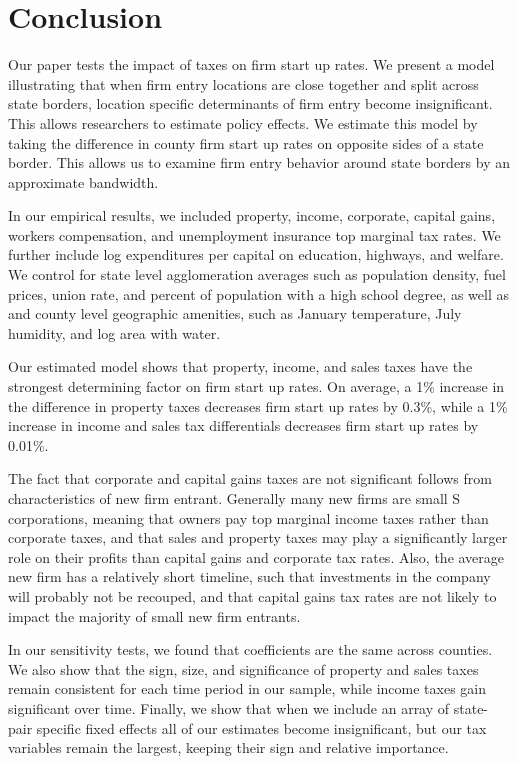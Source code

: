 \section{Conclusion}

Our paper tests the impact of taxes on firm start up rates. We present a model illustrating that when firm entry locations are close together and split across state borders, location specific determinants of firm entry become insignificant. This allows researchers to estimate policy effects. We estimate this model by taking the difference in county firm start up rates on opposite sides of a state border. This allows us to examine firm entry behavior around state borders by an approximate bandwidth.

In our empirical results, we included property, income, corporate, capital gains, workers compensation, and unemployment insurance top marginal tax rates. We further include log expenditures per capital on education, highways, and welfare. We control for state level agglomeration averages such as population density, fuel prices, union rate, and percent of population with a high school degree, as well as and county level geographic amenities, such as January temperature, July humidity, and log area with water.

Our estimated model shows that property, income, and sales taxes have the strongest determining factor on firm start up rates. On average, a 1\% increase in the difference in property taxes decreases firm start up rates by 0.3\%, while a 1\% increase in income and sales tax differentials decreases firm start up rates by 0.01\%. 

The fact that corporate and capital gains taxes are not significant follows from characteristics of new firm entrant. Generally many new firms are small S corporations, meaning that owners pay top marginal income taxes rather than corporate taxes, and that sales and property taxes may play a significantly larger role on their profits than capital gains and corporate tax rates. Also, the average new firm has a relatively short timeline, such that investments in the company will probably not be recouped, and that capital gains tax rates are not likely to impact the majority of small new firm entrants.

In our sensitivity tests, we found that coefficients are the same across counties. We also show that the sign, size, and significance of property and sales taxes remain consistent for each time period in our sample, while income taxes gain significant over time. Finally, we show that when we include an array of state-pair specific fixed effects all of our estimates become insignificant, but our tax variables remain the largest, keeping their sign and relative importance.

